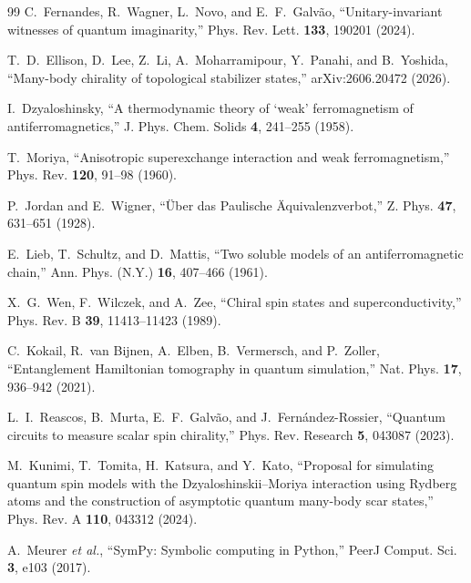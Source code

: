 \documentclass[11pt]{article}
\begin{document}
\begin{thebibliography}{99}
C.~Fernandes, R.~Wagner, L.~Novo, and E.~F.~Galv\~ao,
``Unitary-invariant witnesses of quantum imaginarity,''
Phys. Rev. Lett. \textbf{133}, 190201 (2024).

T.~D.~Ellison, D.~Lee, Z.~Li, A.~Moharramipour, Y.~Panahi, and B.~Yoshida,
``Many-body chirality of topological stabilizer states,''
arXiv:2606.20472 (2026).

I.~Dzyaloshinsky,
``A thermodynamic theory of `weak' ferromagnetism of antiferromagnetics,''
J. Phys. Chem. Solids \textbf{4}, 241--255 (1958).

T.~Moriya,
``Anisotropic superexchange interaction and weak ferromagnetism,''
Phys. Rev. \textbf{120}, 91--98 (1960).

P.~Jordan and E.~Wigner,
``\"Uber das Paulische \"Aquivalenzverbot,''
Z. Phys. \textbf{47}, 631--651 (1928).

E.~Lieb, T.~Schultz, and D.~Mattis,
``Two soluble models of an antiferromagnetic chain,''
Ann. Phys. (N.Y.) \textbf{16}, 407--466 (1961).

X.~G.~Wen, F.~Wilczek, and A.~Zee,
``Chiral spin states and superconductivity,''
Phys. Rev. B \textbf{39}, 11413--11423 (1989).

C.~Kokail, R.~van Bijnen, A.~Elben, B.~Vermersch, and P.~Zoller,
``Entanglement Hamiltonian tomography in quantum simulation,''
Nat. Phys. \textbf{17}, 936--942 (2021).

L.~I.~Reascos, B.~Murta, E.~F.~Galv\~ao, and J.~Fern\'andez-Rossier,
``Quantum circuits to measure scalar spin chirality,''
Phys. Rev. Research \textbf{5}, 043087 (2023).

M.~Kunimi, T.~Tomita, H.~Katsura, and Y.~Kato,
``Proposal for simulating quantum spin models with the
Dzyaloshinskii--Moriya interaction using Rydberg atoms and the construction of
asymptotic quantum many-body scar states,''
Phys. Rev. A \textbf{110}, 043312 (2024).

A.~Meurer \textit{et al.},
``SymPy: Symbolic computing in Python,''
PeerJ Comput. Sci. \textbf{3}, e103 (2017).

\end{thebibliography}
\end{document}
